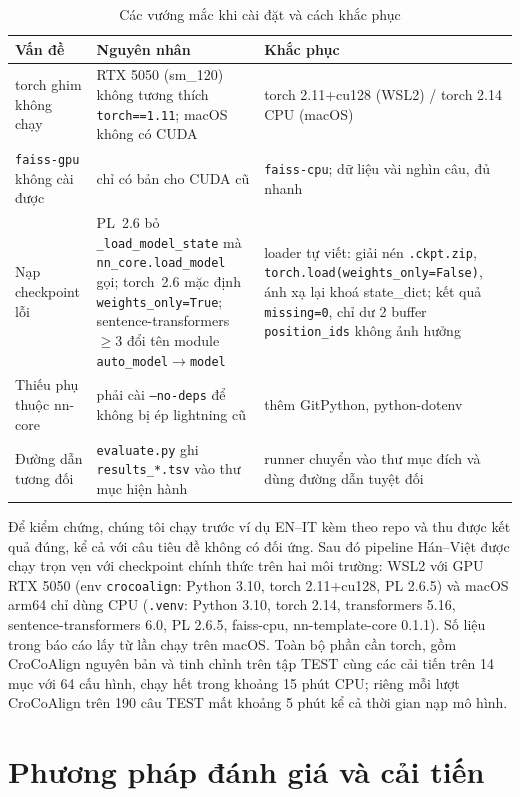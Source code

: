 \documentclass[11pt,a4paper]{article}
\newcommand{\code}[1]{\texttt{#1}}
\newcommand{\B}[1]{\textbf{#1}}
\newcommand{\croco}{CroCoAlign}
\begin{document}
\begin{table}[h]\centering\small
\caption{Các vướng mắc khi cài đặt và cách khắc phục}\label{tab:install}
\begin{tabular}{p{3.4cm}p{5.4cm}p{6.6cm}}
\toprule
\B{Vấn đề} & \B{Nguyên nhân} & \B{Khắc phục}\\
\midrule
torch ghim không chạy & RTX 5050 (sm\_120) không tương thích \code{torch==1.11}; macOS không có CUDA & torch 2.11+cu128 (WSL2) / torch 2.14 CPU (macOS)\\
\code{faiss-gpu} không cài được & chỉ có bản cho CUDA cũ & \code{faiss-cpu}; dữ liệu vài nghìn câu, đủ nhanh\\
Nạp checkpoint lỗi & PL~2.6 bỏ \code{\_load\_model\_state} mà \code{nn\_core.load\_model} gọi; torch~2.6 mặc định \code{weights\_only=True}; sentence-transformers~$\ge$3 đổi tên module \code{auto\_model}$\to$\code{model} & loader tự viết: giải nén \code{.ckpt.zip}, \code{torch.load(weights\_only=False)}, ánh xạ lại khoá state\_dict; kết quả \code{missing=0}, chỉ dư 2 buffer \code{position\_ids} không ảnh hưởng\\
Thiếu phụ thuộc nn-core & phải cài \code{--no-deps} để không bị ép lightning cũ & thêm GitPython, python-dotenv\\
Đường dẫn tương đối & \code{evaluate.py} ghi \code{results\_*.tsv} vào thư mục hiện hành & runner chuyển vào thư mục đích và dùng đường dẫn tuyệt đối\\
\bottomrule
\end{tabular}
\end{table}

Để kiểm chứng, chúng tôi chạy trước ví dụ EN--IT kèm theo repo và thu được kết quả đúng, kể cả với câu tiêu đề không
có đối ứng. Sau đó pipeline Hán--Việt được chạy trọn vẹn với checkpoint chính thức trên hai môi trường: WSL2 với GPU
RTX 5050 (env \code{crocoalign}: Python 3.10, torch 2.11+cu128, PL 2.6.5) và macOS arm64 chỉ dùng CPU (\code{.venv}:
Python 3.10, torch 2.14, transformers 5.16, sentence-transformers 6.0, PL 2.6.5, faiss-cpu, nn-template-core 0.1.1).
Số liệu trong báo cáo lấy từ lần chạy trên macOS. Toàn bộ phần cần torch, gồm \croco{} nguyên bản và tinh chỉnh trên
tập TEST cùng các cải tiến trên 14 mục với 64 cấu hình, chạy hết trong khoảng 15 phút CPU; riêng mỗi lượt \croco{} trên
190 câu TEST mất khoảng 5 phút kể cả thời gian nạp mô hình.

\section{Phương pháp đánh giá và cải tiến}\label{sec:eval}
\end{document}
